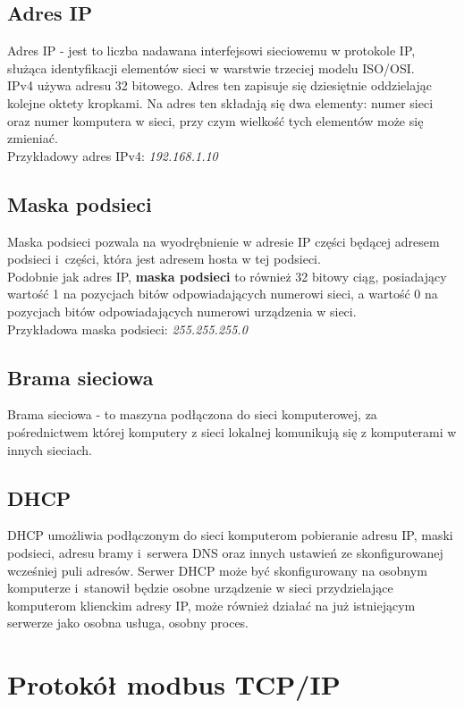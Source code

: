 \documentclass[12pt]{article}
\begin{document}
\subsection{Adres IP}
Adres IP - jest to liczba nadawana interfejsowi sieciowemu w protokole IP, służąca identyfikacji elementów sieci w warstwie trzeciej modelu ISO/OSI.\\
IPv4 używa adresu 32 bitowego. Adres ten zapisuje się dziesiętnie oddzielając kolejne oktety kropkami. Na adres ten składają się dwa elementy: numer sieci oraz numer komputera w sieci, przy czym wielkość tych elementów może się zmieniać.\\
Przykładowy adres IPv4: \textit{192.168.1.10}
\subsection{Maska podsieci}
Maska podsieci pozwala na wyodrębnienie w adresie IP części będącej adresem podsieci i~części, która jest adresem hosta w tej podsieci.\\
Podobnie jak adres IP, \textbf{maska podsieci} to również 32 bitowy ciąg, posiadający wartość 1 na pozycjach bitów odpowiadających numerowi sieci, a wartość 0 na pozycjach bitów odpowiadających numerowi urządzenia w sieci.\\
Przykładowa maska podsieci: \textit{255.255.255.0}
\subsection{Brama sieciowa}
Brama sieciowa - to maszyna podłączona do sieci komputerowej, za pośrednictwem której komputery z sieci lokalnej komunikują się z komputerami w innych sieciach.
\subsection{DHCP}
DHCP umożliwia podłączonym do sieci komputerom pobieranie adresu IP, maski podsieci, adresu bramy i~serwera DNS oraz innych ustawień ze skonfigurowanej wcześniej puli adresów. Serwer DHCP może być skonfigurowany na osobnym komputerze i~stanowił będzie osobne urządzenie w sieci przydzielające komputerom klienckim adresy IP, może również działać na już istniejącym serwerze jako osobna usługa, osobny proces.
\section{Protokół modbus TCP/IP}
\end{document}
